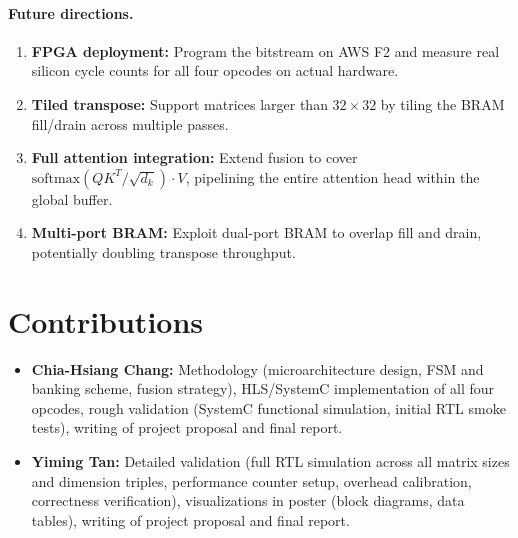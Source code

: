 \documentclass[11pt]{article}
\begin{document}
\paragraph{Future directions.}
\begin{enumerate}[nosep]
  \item \textbf{FPGA deployment:} Program the bitstream on AWS F2 and
        measure real silicon cycle counts for all four opcodes on actual
        hardware.
  \item \textbf{Tiled transpose:} Support matrices larger than $32\!\times\!32$
        by tiling the BRAM fill/drain across multiple passes.
  \item \textbf{Full attention integration:} Extend fusion to cover
        $\text{softmax}(QK^T/\sqrt{d_k}) \cdot V$, pipelining the entire
        attention head within the global buffer.
  \item \textbf{Multi-port BRAM:} Exploit dual-port BRAM to overlap fill and
        drain, potentially doubling transpose throughput.
\end{enumerate}


\section{Contributions}

\begin{itemize}[nosep]
  \item \textbf{Chia-Hsiang Chang:} Methodology (microarchitecture design,
        FSM and banking scheme, fusion strategy), HLS/SystemC implementation
        of all four opcodes, rough validation (SystemC functional simulation,
        initial RTL smoke tests), writing of project proposal and final report.
  \item \textbf{Yiming Tan:} Detailed validation (full RTL simulation across
        all matrix sizes and dimension triples, performance counter setup,
        overhead calibration, correctness verification), visualizations in
        poster (block diagrams, data tables), writing of project proposal and
        final report.
\end{itemize}
\end{document}
